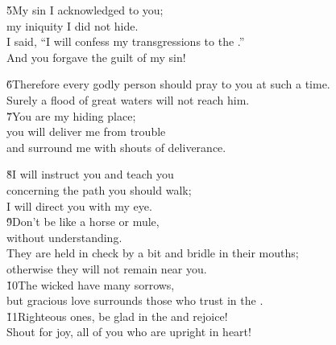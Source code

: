 \begin{poetry}
\poeml \v{5}My sin I acknowledged to you; \\
\poemll    my iniquity I did not hide. \\
\poeml I said, ``I will confess my transgressions to the .'' \\
\poemll    And you forgave the guilt of my sin!
\end{poetry}

\begin{poetry}
\poeml \v{6}Therefore every godly person should pray to you at such a time. \\
\poemll    Surely a flood of great waters will not reach him. \\
\poeml \v{7}You are my hiding place; \\
\poemll    you will deliver me from trouble \\
\poemlll       and surround me with shouts of deliverance.
\end{poetry}

\begin{poetry}
\poeml \v{8}I will instruct you and teach you \\
\poemll    concerning the path you should walk; \\
\poemlll       I will direct you with my eye. \\
\poeml \v{9}Don't be like a horse or mule, \\
\poemll    without understanding. \\
\poeml They are held in check by a bit and bridle in their mouths; \\
\poemll    otherwise they will not remain near you. \\
\poeml \v{10}The wicked have many sorrows, \\
\poemll    but gracious love surrounds those who trust in the . \\
\poeml \v{11}Righteous ones, be glad in the  and rejoice! \\
\poemll    Shout for joy, all of you who are upright in heart!
\end{poetry}

